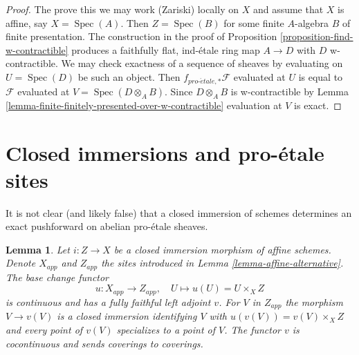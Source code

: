 \documentclass[10pt,a4paper]{article}
\theoremstyle{plain}
\newtheorem{lemma}[subsection]{Lemma}
\theoremstyle{definition}
\theoremstyle{remark}
\numberwithin{equation}{subsection}
\def\Spec{\mathop{\mathrm{Spec}}}
\def\proetale{{pro\text{-}\acute{e}tale}}
\begin{document}
\begin{proof}
The prove this we may work (Zariski) locally on $X$ and assume that $X$
is affine, say $X = \Spec(A)$. Then $Z = \Spec(B)$ for some finite
$A$-algebra $B$ of finite presentation. The construction in the proof of
Proposition \ref{proposition-find-w-contractible}
produces a faithfully flat, ind-\'etale ring map $A \to D$
with $D$ w-contractible. We may check exactness of a sequence of
sheaves by evaluating on $U = \Spec(D)$ be such an object. Then
$f_{\proetale, *}\mathcal{F}$
evaluated at $U$ is equal to $\mathcal{F}$ evaluated at
$V = \Spec(D \otimes_A B)$. Since $D \otimes_A B$ is w-contractible
by Lemma \ref{lemma-finite-finitely-presented-over-w-contractible}
evaluation at $V$ is exact.
\end{proof}








\section{Closed immersions and pro-\'etale sites}
\label{section-closed-immersion}

\noindent
It is not clear (and likely false) that a closed immersion of schemes
determines an exact pushforward on abelian pro-\'etale sheaves.

\begin{lemma}
\label{lemma-closed-immersion-affines}
Let $i : Z \to X$ be a closed immersion morphism of affine schemes.
Denote $X_{app}$ and $Z_{app}$ the sites introduced in
Lemma \ref{lemma-affine-alternative}.
The base change functor
$$
u : X_{app} \to Z_{app},\quad U \longmapsto u(U) = U \times_X Z
$$
is continuous and has a fully faithful left adjoint $v$.
For $V$ in $Z_{app}$ the morphism $V \to v(V)$ is a closed immersion
identifying $V$ with $u(v(V)) = v(V) \times_X Z$ and every point of
$v(V)$ specializes to a point of $V$.
The functor $v$ is cocontinuous and sends coverings to coverings.
\end{lemma}
\end{document}
